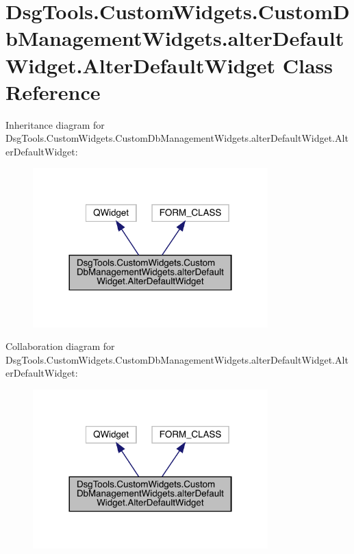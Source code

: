 \hypertarget{class_dsg_tools_1_1_custom_widgets_1_1_custom_db_management_widgets_1_1alter_default_widget_1_1_alter_default_widget}{}\section{Dsg\+Tools.\+Custom\+Widgets.\+Custom\+Db\+Management\+Widgets.\+alter\+Default\+Widget.\+Alter\+Default\+Widget Class Reference}
\label{class_dsg_tools_1_1_custom_widgets_1_1_custom_db_management_widgets_1_1alter_default_widget_1_1_alter_default_widget}


Inheritance diagram for Dsg\+Tools.\+Custom\+Widgets.\+Custom\+Db\+Management\+Widgets.\+alter\+Default\+Widget.\+Alter\+Default\+Widget\+:
\nopagebreak
\begin{figure}[H]
\begin{center}
\leavevmode
\includegraphics[width=257pt]{class_dsg_tools_1_1_custom_widgets_1_1_custom_db_management_widgets_1_1alter_default_widget_1_1_fa532bc5fe14d4326fff2018779cf452}
\end{center}
\end{figure}


Collaboration diagram for Dsg\+Tools.\+Custom\+Widgets.\+Custom\+Db\+Management\+Widgets.\+alter\+Default\+Widget.\+Alter\+Default\+Widget\+:
\nopagebreak
\begin{figure}[H]
\begin{center}
\leavevmode
\includegraphics[width=257pt]{class_dsg_tools_1_1_custom_widgets_1_1_custom_db_management_widgets_1_1alter_default_widget_1_1_3f146a85897cde2ea320716a4b5b65d5}
\end{center}
\end{figure}
